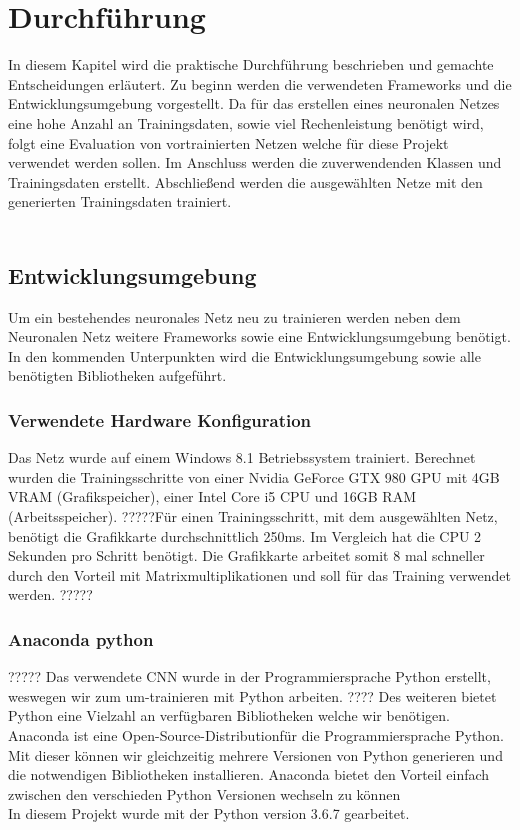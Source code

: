 \documentclass[a4paper,12pt,oneside]{article}
\begin{document}
  \section{Durchführung}
In diesem Kapitel wird die praktische Durchführung beschrieben und gemachte Entscheidungen erläutert. Zu beginn werden die verwendeten Frameworks und die Entwicklungsumgebung vorgestellt. Da für das erstellen eines neuronalen Netzes eine hohe Anzahl an Trainingsdaten, sowie viel Rechenleistung benötigt wird, folgt eine Evaluation von vortrainierten Netzen welche für diese Projekt verwendet werden sollen. Im Anschluss werden die zuverwendenden Klassen und Trainingsdaten erstellt. Abschließend werden die ausgewählten Netze mit den generierten Trainingsdaten trainiert. \\
\\

\subsection{Entwicklungsumgebung}
Um ein bestehendes neuronales Netz neu zu trainieren werden neben dem Neuronalen Netz weitere Frameworks sowie eine Entwicklungsumgebung benötigt. In den kommenden Unterpunkten wird die Entwicklungsumgebung sowie alle benötigten Bibliotheken aufgeführt. 

  \subsubsection{Verwendete Hardware Konfiguration}
Das Netz wurde auf einem Windows 8.1 Betriebssystem trainiert. Berechnet wurden die Trainingsschritte von einer Nvidia GeForce GTX 980 GPU mit 4GB VRAM (Grafikspeicher), einer Intel Core i5 CPU und 16GB RAM (Arbeitsspeicher). ?????Für einen Trainingsschritt, mit dem ausgewählten Netz, benötigt die Grafikkarte durchschnittlich 250ms. Im Vergleich hat die CPU 2 Sekunden pro Schritt benötigt. Die Grafikkarte arbeitet somit 8 mal schneller durch den Vorteil mit Matrixmultiplikationen und soll für das Training verwendet werden. ?????

  \subsubsection{Anaconda python}
 ????? Das verwendete CNN wurde in der Programmiersprache Python erstellt, weswegen wir zum um-trainieren mit Python arbeiten. ???? Des weiteren bietet Python eine Vielzahl an verfügbaren Bibliotheken welche wir benötigen. Anaconda \cite{conda2018} ist eine \glqq Open-Source-Distribution\grqq für die Programmiersprache Python. Mit dieser können wir gleichzeitig mehrere Versionen von Python generieren und die notwendigen Bibliotheken installieren. Anaconda bietet den Vorteil einfach zwischen den verschieden Python Versionen wechseln zu können \\
In diesem Projekt wurde mit der Python version 3.6.7 gearbeitet.
\end{document}
